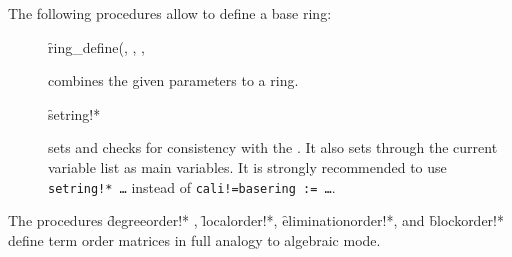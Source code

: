 The following procedures allow to define a base ring:
\begin{description}
\item[]
  \hypertarget{procedure:RING_DEFINE}{}
  \begin{syntax}
    \f{ring\_define}(, , , 
  \end{syntax}
combines the given parameters to a ring.

\item[]
  \hypertarget{procedure:SETRING!*}{}
  \begin{syntax}
    \f{setring!*} 
  \end{syntax}
sets  and checks for consistency with the
. It also sets through
 the current variable list as main variables. It is
strongly recommended to use \texttt{setring!* \ldots} instead of
\texttt{cali!=basering := \ldots}.
\end{description}
The procedures \f{degreeorder!*} , \f{localorder!*}, \f{eliminationorder!*}, and
\f{blockorder!*}
define term order matrices in full analogy to algebraic mode.
\medskip


